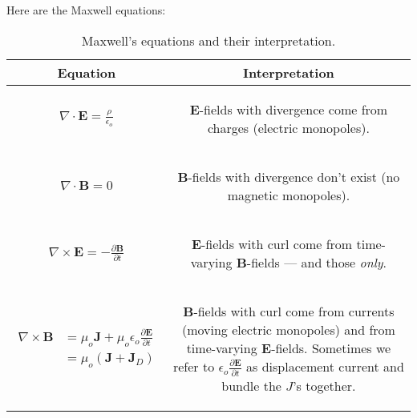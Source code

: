 \documentclass{article}
\numberwithin{equation}{section}
\begin{document}
Here are the Maxwell equations:

\begin{table}[H]
\centering
{}
\caption{Maxwell's equations and their interpretation.}
\begin{tabular}{@{}c|c@{}}
\toprule
Equation & Interpretation \\ \midrule
{\parbox[c]{0.3\linewidth}{\begin{gather*} \nabla \cdot \bm{E} = \frac{\rho}{\epsilon_o} \end{gather*}}} & {\parbox[c]{0.6\linewidth}{\begin{center} $\bm{E}$-fields with divergence come from charges (electric monopoles). \end{center}}} \\ \midrule
{\parbox[c]{0.3\linewidth}{\begin{gather*} \nabla \cdot \bm{B} = 0 \end{gather*}}} & {\parbox[c]{0.6\linewidth}{\begin{center} $\bm{B}$-fields with divergence don't exist (no magnetic monopoles). \end{center}}} \\ \midrule
{\parbox[c]{0.3\linewidth}{\begin{gather*} \nabla \times \bm{E} = -\frac{\partial \bm{B}}{\partial t} \end{gather*}}} & {\parbox[c]{0.6\linewidth}{\begin{center} $\bm{E}$-fields with curl come from time-varying $\bm{B}$-fields --- and those \emph{only}. \end{center}}} \\ \midrule
{\parbox[c]{0.3\linewidth}{\begin{align*} \nabla \times \bm{B} &= \mu_o \bm{J} + \mu_o \epsilon_o \frac{\partial \bm{E}}{\partial t} \\ &= \mu_o \left( \bm{J} + \bm{J}_D \right) \end{align*}}} & {\parbox[c]{0.6\linewidth}{\begin{center} $\bm{B}$-fields with curl come from currents (moving electric monopoles) and from time-varying $\bm{E}$-fields. Sometimes we refer to $\epsilon_o \frac{\partial \bm{E}}{\partial t}$ as displacement current and bundle the $J$'s together. \end{center}}} \\ \bottomrule
\end{tabular}
\end{table}
\end{document}
